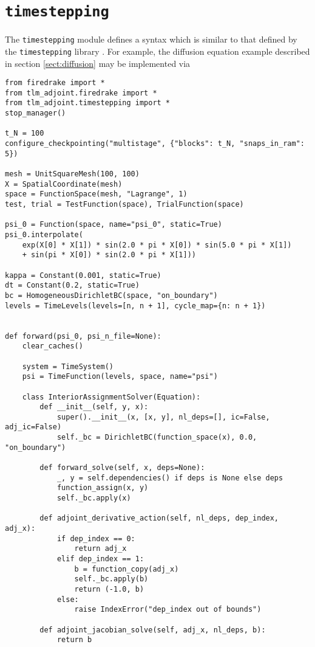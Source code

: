 \documentclass[11pt]{article}
\begin{document}
\section{\texttt{timestepping}}

The \texttt{timestepping} module defines a syntax which is similar to that
defined by the \texttt{timestepping} library \citep[see][]{maddison2014}. For
example, the diffusion equation example described in section
\ref{sect:diffusion} may be implemented via
\begin{lstlisting}
from firedrake import *
from tlm_adjoint.firedrake import *
from tlm_adjoint.timestepping import *
stop_manager()

t_N = 100
configure_checkpointing("multistage", {"blocks": t_N, "snaps_in_ram": 5})

mesh = UnitSquareMesh(100, 100)
X = SpatialCoordinate(mesh)
space = FunctionSpace(mesh, "Lagrange", 1)
test, trial = TestFunction(space), TrialFunction(space)

psi_0 = Function(space, name="psi_0", static=True)
psi_0.interpolate(
    exp(X[0] * X[1]) * sin(2.0 * pi * X[0]) * sin(5.0 * pi * X[1])
    + sin(pi * X[0]) * sin(2.0 * pi * X[1]))

kappa = Constant(0.001, static=True)
dt = Constant(0.2, static=True)
bc = HomogeneousDirichletBC(space, "on_boundary")
levels = TimeLevels(levels=[n, n + 1], cycle_map={n: n + 1})


def forward(psi_0, psi_n_file=None):
    clear_caches()

    system = TimeSystem()
    psi = TimeFunction(levels, space, name="psi")

    class InteriorAssignmentSolver(Equation):
        def __init__(self, y, x):
            super().__init__(x, [x, y], nl_deps=[], ic=False, adj_ic=False)
            self._bc = DirichletBC(function_space(x), 0.0, "on_boundary")

        def forward_solve(self, x, deps=None):
            _, y = self.dependencies() if deps is None else deps
            function_assign(x, y)
            self._bc.apply(x)

        def adjoint_derivative_action(self, nl_deps, dep_index, adj_x):
            if dep_index == 0:
                return adj_x
            elif dep_index == 1:
                b = function_copy(adj_x)
                self._bc.apply(b)
                return (-1.0, b)
            else:
                raise IndexError("dep_index out of bounds")

        def adjoint_jacobian_solve(self, adj_x, nl_deps, b):
            return b


\end{lstlisting}
\end{document}
